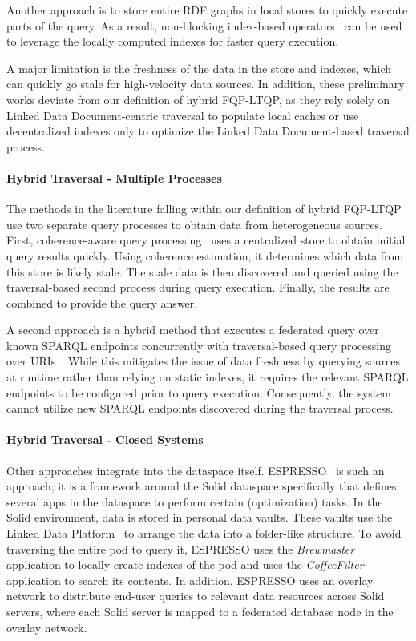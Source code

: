\documentclass{ceurart}
\theoremstyle{definition}
\begin{document}
Another approach is to store entire RDF graphs in local stores to quickly execute parts of the query.
As a result, non-blocking index-based operators~\cite{ladwig2011sihjoin}
can be used to leverage the locally computed indexes for faster query execution.

A major limitation is the freshness of the data in the store and indexes,
which can quickly go stale for high-velocity data sources.
In addition, these preliminary works deviate from our definition of hybrid FQP-LTQP,
as they rely solely on Linked Data Document-centric traversal to populate local caches or use decentralized indexes only to optimize
the Linked Data Document-based traversal process.
\paragraph{Hybrid Traversal - Multiple Processes} The methods in the literature falling within our definition of hybrid FQP-LTQP
use two separate query processes to obtain data from heterogeneous sources.
First, coherence-aware query processing~\cite{umbrich2012hybrid} uses a centralized store to obtain initial query results quickly.
Using coherence estimation, it determines which data from this store is likely stale.
The stale data is then discovered and queried using the traversal-based second process during query execution.
Finally, the results are combined to provide the query answer.

A second approach is a hybrid method that executes a federated query over known SPARQL endpoints 
concurrently with traversal-based query processing
over URIs~\cite{lynden2013hybrid}.
While this mitigates the issue of data freshness by querying sources at runtime rather than relying on static indexes,
it requires the relevant SPARQL endpoints to be configured prior to query execution.
Consequently, the system cannot utilize new SPARQL endpoints discovered during the traversal process.
\paragraph{Hybrid Traversal - Closed Systems} Other approaches integrate into the dataspace itself. 
ESPRESSO~\cite{ragab2023espresso} is such an approach;
it is a framework around the Solid dataspace specifically that defines several apps in the dataspace to perform certain (optimization) tasks.
In the Solid environment, data is stored in personal data vaults. These vaults use the Linked Data Platform~\cite{ldp} to arrange the data into a folder-like
structure.
To avoid traversing the entire pod to query it, ESPRESSO uses the \textit{Brewmaster} application to locally create indexes of the pod 
and uses the \textit{CoffeeFilter} application to search its contents.
In addition, ESPRESSO uses an overlay network to distribute end-user queries to relevant data resources across Solid servers, 
where each Solid server is mapped to a federated database node in the overlay network.
\end{document}
